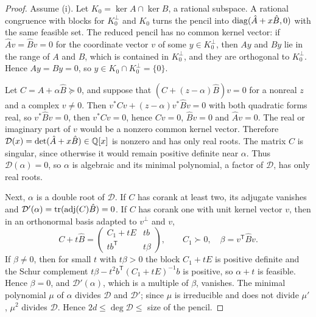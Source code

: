 \begin{proof}
Assume (i). Let $K_0=\ker A\cap\ker B$, a rational subspace. A rational
congruence with blocks for $K_0^\perp$ and $K_0$ turns the pencil into
$\operatorname{diag}(\hat A+x\hat B,0)$ with the same feasible set. The reduced pencil has
no common kernel vector: if $\hat Av=\hat Bv=0$ for the coordinate vector $v$
of some $y\in K_0^\perp$, then $Ay$ and $By$ lie in the range of $A$ and $B$,
which is contained in $K_0^\perp$, and they are orthogonal to $K_0^\perp$.
Hence $Ay=By=0$, so $y\in K_0\cap K_0^\perp=\{0\}$.

Let $C=\hat A+\alpha\hat B\succeq0$, and suppose that
$(C+(z-\alpha)\hat B)v=0$ for a nonreal $z$ and a complex $v\ne0$. Then
$v^*Cv+(z-\alpha)v^*\hat Bv=0$ with both quadratic forms real, so
$v^*\hat Bv=0$, then $v^*Cv=0$, hence $Cv=0$, $\hat Bv=0$ and $\hat Av=0$.
The real or imaginary part of $v$ would be a nonzero common kernel vector.
Therefore $\mathcal D(x)=\det(\hat A+x\hat B)\in\mathbb Q[x]$ is nonzero and has only
real roots. The matrix $C$ is singular, since otherwise it would remain
positive definite near $\alpha$. Thus $\mathcal D(\alpha)=0$, so $\alpha$ is
algebraic and its minimal polynomial, a factor of $\mathcal D$, has only real
roots.

Next, $\alpha$ is a double root of $\mathcal D$. If $C$ has corank at least
two, its adjugate vanishes and $\mathcal D'(\alpha)=\operatorname{tr}(\operatorname{adj}(C)
\hat B)=0$. If $C$ has corank one with unit kernel vector $v$, then in an
orthonormal basis adapted to $v^\perp$ and $v$,
\[
C+t\hat B=\begin{pmatrix}C_1+tE&tb\\ tb^{\mathsf T}&t\beta\end{pmatrix},
\qquad C_1\succ0,\quad\beta=v^{\mathsf T}\hat Bv .
\]
If $\beta\ne0$, then for small $t$ with $t\beta>0$ the block $C_1+tE$ is
positive definite and the Schur complement $t\beta-t^2b^{\mathsf T}
(C_1+tE)^{-1}b$ is positive, so $\alpha+t$ is feasible. Hence $\beta=0$, and
$\mathcal D'(\alpha)$, which is a multiple of $\beta$, vanishes. The minimal
polynomial $\mu$ of $\alpha$ divides $\mathcal D$ and $\mathcal D'$; since
$\mu$ is irreducible and does not divide $\mu'$, $\mu^2$ divides $\mathcal D$.
Hence $2d\le\deg\mathcal D\le$ size of the pencil.


\end{proof}
